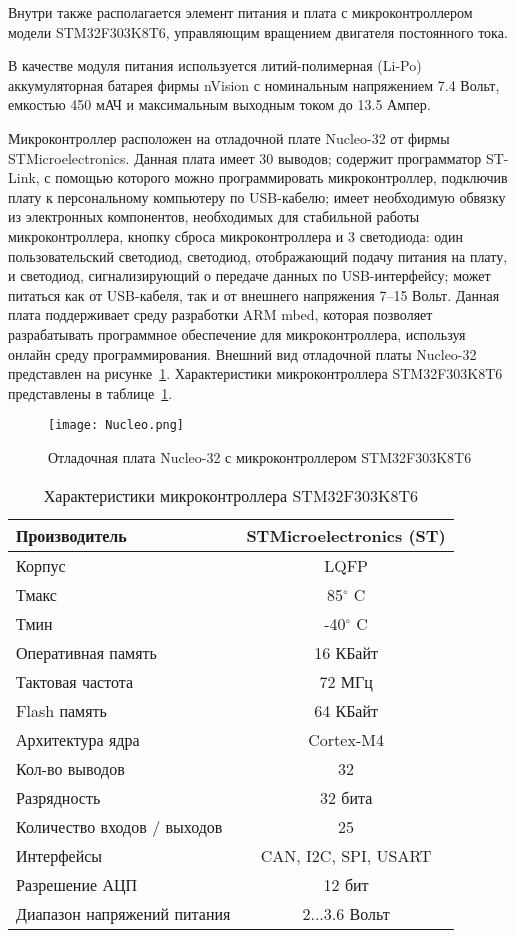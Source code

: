Внутри также располагается элемент питания и плата с микроконтроллером модели STM32F303K8T6, управляющим вращением двигателя постоянного тока. 

В качестве модуля питания используется литий-полимерная (Li-Po) аккумуляторная батарея фирмы nVision с номинальным напряжением 7.4 Вольт, емкостью 450 мАЧ и максимальным выходным током до 13.5 Ампер.


Микроконтроллер расположен на отладочной плате Nucleo-32 от фирмы STMicroelectronics. Данная плата имеет 30 выводов; содержит программатор ST-Link, с помощью которого можно программировать микроконтроллер, подключив плату к персональному компьютеру по USB-кабелю; имеет необходимую обвязку из электронных компонентов, необходимых для стабильной работы микроконтроллера, кнопку сброса микроконтроллера и 3 светодиода: один пользовательский светодиод, светодиод, отображающий подачу питания на плату, и светодиод, сигнализирующий о передаче данных по USB-интерфейсу; может питаться как от USB-кабеля, так и от внешнего напряжения 7--15 Вольт. Данная плата поддерживает среду разработки ARM mbed, которая позволяет разрабатывать программное обеспечение для микроконтроллера, используя онлайн среду программирования. Внешний вид отладочной платы Nucleo-32 представлен на рисунке~\ref{Nucleo}. Характеристики микроконтроллера STM32F303K8T6 представлены в таблице~\ref{tabStm}.

\begin{figure}[h]
	\centering
	\texttt{[image: Nucleo.png]}%
	\caption{Отладочная плата Nucleo-32 с микроконтроллером STM32F303K8T6}
	\label{Nucleo}
\end{figure}

\begin{table}[h]
	\centering
	\caption{Характеристики микроконтроллера STM32F303K8T6}\label{tabStm}
	\begin{tabular}{|l|c|}
		\hline
		Производитель &	STMicroelectronics (ST) \\ \hline
		Корпус 	& LQFP \\ \hline
		Тмакс	&	85$^\circ$ C 	\\ \hline
		Тмин 	&	-40$^\circ$ C \\ \hline
		Оперативная память 	& 16 КБайт\\ \hline
		Тактовая частота	& 72 МГц 	\\ \hline
		Flash память & 64 КБайт\\ \hline
		Архитектура ядра & Cortex-M4	\\ \hline
		Кол-во выводов 	& 32\\ \hline
		Разрядность	& 32 бита\\ \hline
		Количество входов / выходов & 25	\\ \hline
		Интерфейсы 	& CAN, I2C, SPI, USART\\ \hline
		Разрешение АЦП & 12 бит\\ \hline
		Диапазон напряжений питания 	& 2...3.6 Вольт\\ \hline		
	\end{tabular}
\end{table}


